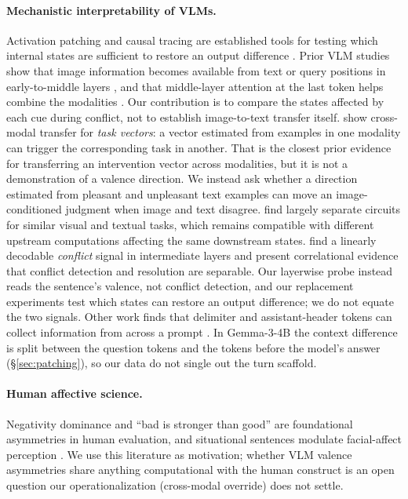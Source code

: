 \documentclass{article}
\newcommand{\gemma}{Gemma-3-4B}
\begin{document}
\paragraph{Mechanistic interpretability of VLMs.}
Activation patching and causal tracing are established tools for testing which internal states are sufficient to restore an output difference \citep{meng2022, patchingbestpractices, attributionpatching}. Prior VLM studies show that image information becomes available from text or query positions in early-to-middle layers \citep{basu2024, whatsintheimage2025, narrowgate2024, towardsinterp2024}, and that middle-layer attention at the last token helps combine the modalities \citep{fcct2026}. Our contribution is to compare the states affected by each cue during conflict, not to establish image-to-text transfer itself. \citet{luo2025} show cross-modal transfer for \emph{task vectors}: a vector estimated from examples in one modality can trigger the corresponding task in another. That is the closest prior evidence for transferring an intervention vector across modalities, but it is not a demonstration of a valence direction. We instead ask whether a direction estimated from pleasant and unpleasant text examples can move an image-conditioned judgment when image and text disagree. \citet{nikankin2025} find largely separate circuits for similar visual and textual tasks, which remains compatible with different upstream computations affecting the same downstream states. \citet{conflictchallenges2025} find a linearly decodable \emph{conflict} signal in intermediate layers and present correlational evidence that conflict detection and resolution are separable. Our layerwise probe instead reads the sentence's valence, not conflict detection, and our replacement experiments test which states can restore an output difference; we do not equate the two signals. Other work finds that delimiter and assistant-header tokens can collect information from across a prompt \citep{xiao2024, activedormant2024, zhang2026anydepth}. In \gemma{} the context difference is split between the question tokens and the tokens before the model's answer (\S\ref{sec:patching}), so our data do not single out the turn scaffold.

\paragraph{Human affective science.}
Negativity dominance \citep{rozin2001} and ``bad is stronger than good'' \citep{baumeister2001} are foundational asymmetries in human evaluation, and situational sentences modulate facial-affect perception \citep{aviezer2008, aviezer2012}. We use this literature as motivation; whether VLM valence asymmetries share anything computational with the human construct is an open question our operationalization (cross-modal override) does not settle.
\end{document}
